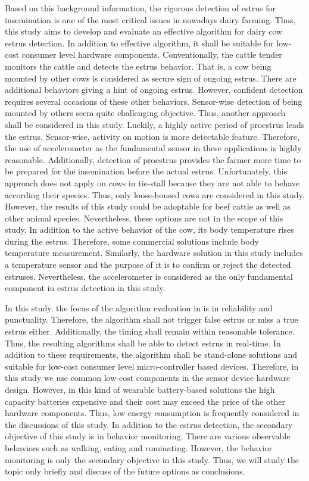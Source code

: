 \documentclass[english,12pt,a4paper,pdftex,elec,utf8]{aaltothesis}
\begin{document}
Based on this background information, the rigorous detection of estrus for insemination is one of the most critical issues in nowadays dairy farming. Thus, this study aims to develop and evaluate an effective algorithm for dairy cow estrus detection. In addition to effective algorithm, it shall be suitable for low-cost consumer level hardware components. Conventionally, the cattle tender monitors the cattle and detects the estrus behavior. That is, a cow being mounted by other cows is considered as secure sign of ongoing estrus. There are additional behaviors giving a hint of ongoing estrus. However, confident detection requires several occasions of these other behaviors. Sensor-wise detection of being mounted by others seem quite challenging objective. Thus, another approach shall be considered in this study. Luckily, a highly active period of proestrus leads the estrus. Sensor-wise, activity on motion is more detectable feature. Therefore, the use of accelerometer as the fundamental sensor in these applications is highly reasonable. Additionally, detection of proestrus provides the farmer more time to be prepared for the insemination before the actual estrus. Unfortunately, this approach does not apply on cows in tie-stall because they are not able to behave according their species. Thus, only loose-housed cows are considered in this study. However, the results of this study could be adoptable for beef cattle as well as other animal species. Nevertheless, these options are not in the scope of this study. In addition to the active behavior of the cow, its body temperature rises during the estrus. Therefore, some commercial solutions include body temperature measurement. Similarly, the hardware solution in this study includes a temperature sensor and the purpose of it is to confirm or reject the detected estruses. Nevertheless, the accelerometer is considered as the only fundamental component in estrus detection in this study.

In this study, the focus of the algorithm evaluation in is in reliability and punctuality. Therefore, the algorithm shall not trigger false estrus or miss a true estrus either. Additionally, the timing shall remain within reasonable tolerance.  Thus, the resulting algorithms shall be able to detect estrus in real-time. In addition to these requirements, the algorithm shall be stand-alone solutions and suitable for low-cost consumer level micro-controller based devices. Therefore, in this study we use common low-cost components in the sensor device hardware design. However, in this kind of wearable battery-based solutions the high capacity batteries expensive and their cost may exceed the price of the other hardware components. Thus, low energy consumption is frequently considered in the discussions of this study. In addition to the estrus detection, the secondary objective of this study is in behavior monitoring. There are various observable behaviors such as walking, eating and ruminating. However, the behavior monitoring is only the secondary objective in this study. Thus, we will study the topic only briefly and discuss of the future options as conclusions.
\end{document}
